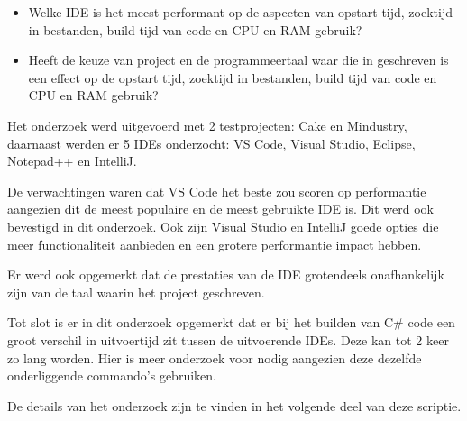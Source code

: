 \begin{itemize}
    \item Welke IDE is het meest performant op de aspecten van opstart tijd, zoektijd in bestanden, build tijd van code en CPU en RAM gebruik?
    \item Heeft de keuze van project en de programmeertaal waar die in geschreven is een effect op de opstart tijd, zoektijd in bestanden, build tijd van code en CPU en RAM gebruik?
\end{itemize}

Het onderzoek werd uitgevoerd met 2 testprojecten: Cake en Mindustry, daarnaast werden er 5 IDEs onderzocht: VS Code, Visual Studio, Eclipse, Notepad++ en IntelliJ.

De verwachtingen waren dat VS Code het beste zou scoren op performantie aangezien dit de meest populaire en de meest gebruikte IDE is. Dit werd ook bevestigd in dit onderzoek. Ook zijn Visual Studio en IntelliJ goede opties die meer functionaliteit aanbieden en een grotere performantie impact hebben.

Er werd ook opgemerkt dat de prestaties van de IDE grotendeels onafhankelijk zijn van de taal waarin het project geschreven.

Tot slot is er in dit onderzoek opgemerkt dat er bij het builden van C\# code een groot verschil in uitvoertijd zit tussen de uitvoerende IDEs. Deze kan tot 2 keer zo lang worden. Hier is meer onderzoek voor nodig aangezien deze dezelfde onderliggende commando's gebruiken.

De details van het onderzoek zijn te vinden in het volgende deel van deze scriptie.
